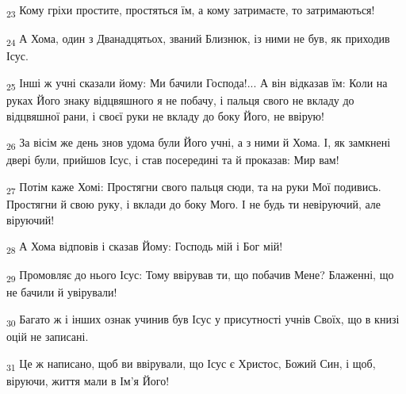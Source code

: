 \begin{tcolorbox}
\textsubscript{23} Кому гріхи простите, простяться їм, а кому затримаєте, то затримаються!
\end{tcolorbox}
\begin{tcolorbox}
\textsubscript{24} А Хома, один з Дванадцятьох, званий Близнюк, із ними не був, як приходив Ісус.
\end{tcolorbox}
\begin{tcolorbox}
\textsubscript{25} Інші ж учні сказали йому: Ми бачили Господа!... А він відказав їм: Коли на руках Його знаку відцвяшного я не побачу, і пальця свого не вкладу до відцвяшної рани, і своєї руки не вкладу до боку Його, не ввірую!
\end{tcolorbox}
\begin{tcolorbox}
\textsubscript{26} За вісім же день знов удома були Його учні, а з ними й Хома. І, як замкнені двері були, прийшов Ісус, і став посередині та й проказав: Мир вам!
\end{tcolorbox}
\begin{tcolorbox}
\textsubscript{27} Потім каже Хомі: Простягни свого пальця сюди, та на руки Мої подивись. Простягни й свою руку, і вклади до боку Мого. І не будь ти невіруючий, але віруючий!
\end{tcolorbox}
\begin{tcolorbox}
\textsubscript{28} А Хома відповів і сказав Йому: Господь мій і Бог мій!
\end{tcolorbox}
\begin{tcolorbox}
\textsubscript{29} Промовляє до нього Ісус: Тому ввірував ти, що побачив Мене? Блаженні, що не бачили й увірували!
\end{tcolorbox}
\begin{tcolorbox}
\textsubscript{30} Багато ж і інших ознак учинив був Ісус у присутності учнів Своїх, що в книзі оцій не записані.
\end{tcolorbox}
\begin{tcolorbox}
\textsubscript{31} Це ж написано, щоб ви ввірували, що Ісус є Христос, Божий Син, і щоб, віруючи, життя мали в Ім'я Його!
\end{tcolorbox}
